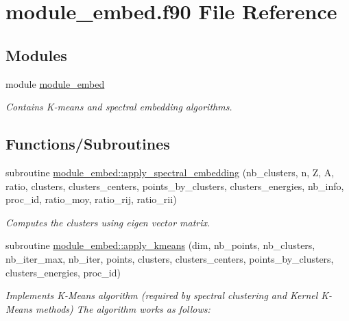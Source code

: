 \hypertarget{module__embed_8f90}{}\section{module\+\_\+embed.\+f90 File Reference}
\label{module__embed_8f90}
\subsection*{Modules}
\begin{DoxyCompactItemize}
\item 
module \hyperlink{namespacemodule__embed}{module\+\_\+embed}
\begin{DoxyCompactList}\small\item\em Contains K-\/means and spectral embedding algorithms. \end{DoxyCompactList}\end{DoxyCompactItemize}
\subsection*{Functions/\+Subroutines}
\begin{DoxyCompactItemize}
\item 
subroutine \hyperlink{namespacemodule__embed_ab78350f96b04d0ce2ca0bd10abd50440}{module\+\_\+embed\+::apply\+\_\+spectral\+\_\+embedding} (nb\+\_\+clusters, n, Z, A, ratio, clusters, clusters\+\_\+centers, points\+\_\+by\+\_\+clusters, clusters\+\_\+energies, nb\+\_\+info, proc\+\_\+id, ratio\+\_\+moy, ratio\+\_\+rij, ratio\+\_\+rii)
\begin{DoxyCompactList}\small\item\em Computes the clusters using eigen vector matrix. \end{DoxyCompactList}\item 
subroutine \hyperlink{namespacemodule__embed_a27f0555abee781e67c2def5e2b9471d2}{module\+\_\+embed\+::apply\+\_\+kmeans} (dim, nb\+\_\+points, nb\+\_\+clusters, nb\+\_\+iter\+\_\+max, nb\+\_\+iter, points, clusters, clusters\+\_\+centers, points\+\_\+by\+\_\+clusters, clusters\+\_\+energies, proc\+\_\+id)
\begin{DoxyCompactList}\small\item\em Implements K-\/\+Means algorithm (required by spectral clustering and Kernel K-\/\+Means methods) The algorithm works as follows\+: \end{DoxyCompactList}\end{DoxyCompactItemize}
